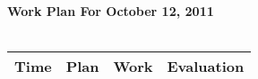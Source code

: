 \documentclass{article}
\begin{document}
\begin{table}[ht!]

{\Huge \bf Work Plan For October 12, 2011}
{\Huge \bf \FilledWeakRainCloud\,}\\
\phantom{stuff} \\

\centering
\begin{tabular}{|l|l|l|l|}
\hline

{\bf \phantom{xxx}Time\phantom{xxx}}
 & {\bf \phantom{xxxxxxxxxxxx}Plan\phantom{xxxxxxxxxxxx}}
 & {\bf \phantom{xxxxxxxxxxxx}Work\phantom{xxxxxxxxxxxx}}
 & {\bf \phantom{xxx}Evaluation\phantom{xxx}}
 \\
\hline




\end{tabular}
\end{table}
\end{document}
